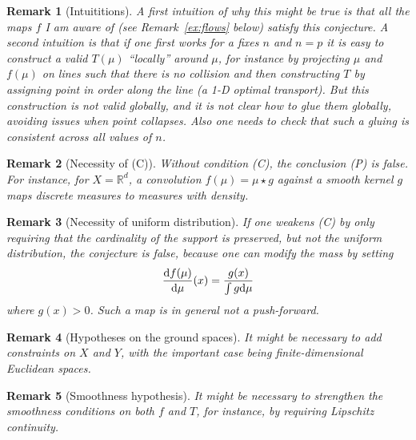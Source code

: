\documentclass{article}
\newtheorem{remark}{Remark}
\begin{document}
\begin{remark}[Intuititions]
	A first intuition of why this might be true is that all the maps $f$ I am aware of (see Remark~\ref{ex:flows} below) satisfy this conjecture.  
	A second intuition is that if one first works for a fixes $n$ and $n=p$ it is easy to construct a valid $T(\mu)$ ``locally'' around $\mu$, for instance by projecting $\mu$ and $f(\mu)$ on lines such that there is no collision and then constructing $T$ by assigning point in order along the line (a 1-D optimal transport). But this construction is not valid globally, and it is not clear how to glue them globally, avoiding issues when point collapses. Also one needs to check that such a gluing is consistent across all values of $n$.   
\end{remark}

\begin{remark}[Necessity of (C)]
Without condition (C), the conclusion (P) is false. For instance, for \( X = \mathbb{R}^d \), a convolution \( f(\mu) = \mu \star g \) against a smooth kernel \( g \) maps discrete measures to measures with density. 
\end{remark}

\begin{remark}[Necessity of uniform distribution]
If one weakens (C) by only requiring that the cardinality of the support is preserved, but not the uniform distribution, the conjecture is false, because one can modify the mass by setting 
$$
	\frac{\text{\upshape d}f(\mu)}{\text{\upshape d}\mu}(x) = \frac{g(x)}{ \int g \text{\upshape d}\mu }
$$
where $g(x)>0$. Such a map is in general not a push-forward. 
\end{remark}

\begin{remark}[Hypotheses on the ground spaces]
It might be necessary to add constraints on \( X \) and \( Y \), with the important case being finite-dimensional Euclidean spaces.
\end{remark}

\begin{remark}[Smoothness hypothesis]
It might be necessary to strengthen the smoothness conditions on both \( f \) and \( T \), for instance, by requiring Lipschitz continuity.
\end{remark}
\end{document}
